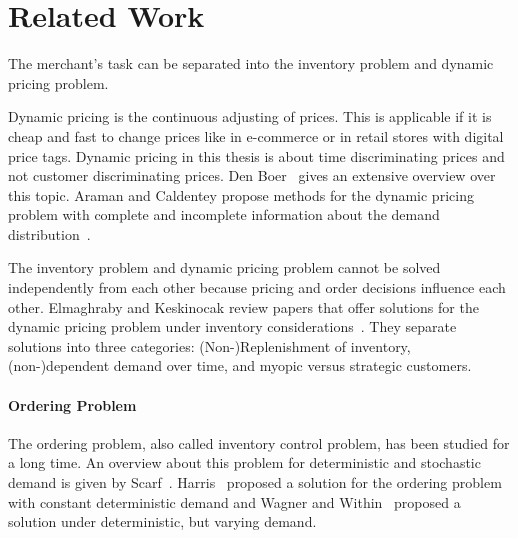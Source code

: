
\chapter{Related Work}

The merchant's task can be separated into the inventory problem and dynamic pricing problem.

Dynamic pricing is the continuous adjusting of prices.
This is applicable if it is cheap and fast to change prices like in e-commerce or in retail stores with digital price tags. %
Dynamic pricing in this thesis is about time discriminating prices and not customer discriminating prices. %
Den Boer~\cite{den2015dynamic} gives an extensive overview over this topic.
Araman and Caldentey propose methods for the dynamic pricing problem with complete and incomplete information about the demand distribution~\cite{araman2011revenue}.

The inventory problem and dynamic pricing problem cannot be solved independently from each other because pricing and order decisions influence each other.
Elmaghraby and Keskinocak review papers that offer solutions for the dynamic pricing problem under inventory considerations~\cite{elmaghraby2003dynamic}.
They separate solutions into three categories:
(Non-)Replenishment of inventory, (non-)dependent demand over time, and myopic versus strategic customers.




\subsubsection*{Ordering Problem}
The ordering problem, also called inventory control problem, has been studied for a long time.
An overview about this problem for deterministic and stochastic demand is given by Scarf~\cite{scarf1963survey}.
Harris~\cite{harris1913many} proposed a solution for the ordering problem with constant deterministic demand and Wagner and Within~\cite{wagner1958dynamic} proposed a solution under deterministic, but varying demand.

